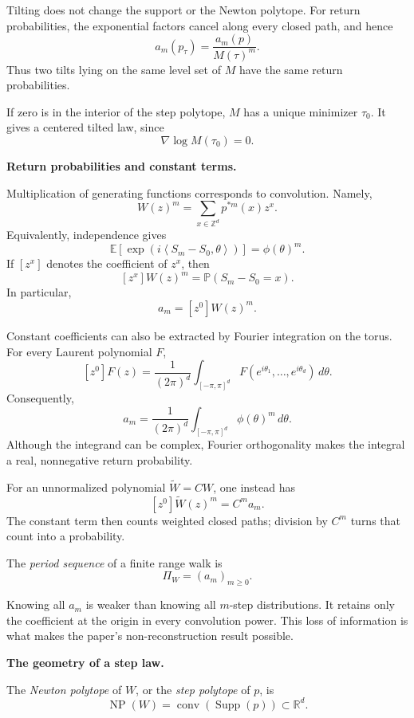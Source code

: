 Tilting does not change the support or the
Newton polytope. For return probabilities,
the exponential factors cancel along every
closed path, and hence
$$
a_m(p_\tau)=\frac{a_m(p)}{M(\tau)^m}.
$$
Thus two tilts lying on the same level set
of $M$ have the same return probabilities.

If zero is in the interior of the step
polytope, $M$ has a unique minimizer
$\tau_0$. It gives a centered tilted law,
since
$$
\nabla\log M(\tau_0)=0.
$$

\medskip\noindent
{\bf Return probabilities and constant
terms.}

Multiplication of generating functions
corresponds to convolution. Namely,
$$
W(z)^m
=\sum_{x\in\mathbb Z^d}p^{*m}(x)z^x.
$$
Equivalently, independence gives
$$
\mathbb E
 [\exp(i\left\langle{}
 S_m-S_0,\theta\right\rangle{})]
=\phi(\theta)^m.
$$
If $[z^x]$ denotes the coefficient of
$z^x$, then
$$
[z^x]W(z)^m
=\mathbb P(S_m-S_0=x).
$$
In particular,
$$
a_m=[z^0]W(z)^m.
$$

Constant coefficients can also be
extracted by Fourier integration on the
torus. For every Laurent polynomial $F$,
$$
[z^0]F(z)
=\frac{1}{(2\pi)^d}
 \int_{[-\pi,\pi]^d}
 F(e^{i\theta_1},\ldots,
 e^{i\theta_d})\,d\theta.
$$
Consequently,
$$
a_m
=\frac{1}{(2\pi)^d}
 \int_{[-\pi,\pi]^d}
 \phi(\theta)^m\,d\theta.
$$
Although the integrand can be complex,
Fourier orthogonality makes the integral a
real, nonnegative return probability.

For an unnormalized polynomial
$\widetilde W=CW$, one instead has
$$
[z^0]\widetilde W(z)^m=C^m a_m.
$$
The constant term then counts weighted
closed paths; division by $C^m$ turns that
count into a probability.

\begin{definition}
\label{definition-period-sequence}
The \emph{period sequence} of a finite
range walk is
$$
\Pi_W=(a_m)_{m\geq 0}.
$$
\end{definition}

Knowing all $a_m$ is weaker than knowing
all $m$-step distributions. It retains only
the coefficient at the origin in every
convolution power. This loss of information
is what makes the paper's non-reconstruction
result possible.

\medskip\noindent
{\bf The geometry of a step law.}

\begin{definition}
\label{definition-newton-polytope-step-law}
The \emph{Newton polytope} of $W$, or the
\emph{step polytope} of $p$, is
$$
\operatorname{NP}(W)
=\operatorname{conv}
 (\operatorname{Supp}(p))
\subset\mathbb R^d.
$$
\end{definition}


